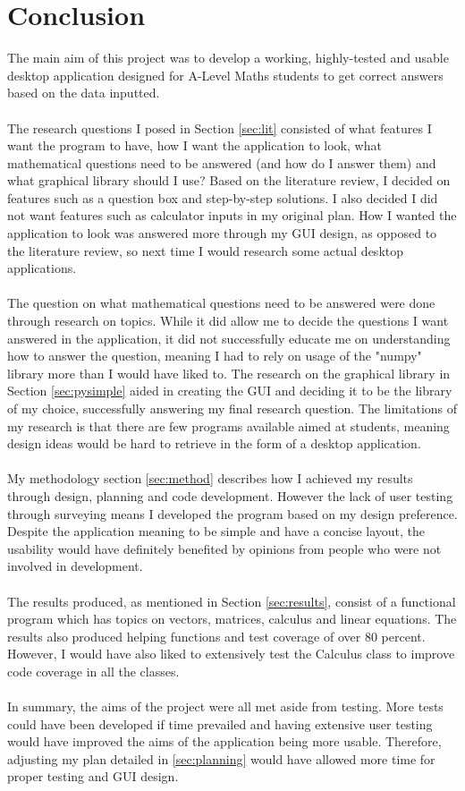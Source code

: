 \documentclass[final]{cmpreport}
\begin{document}
	\section{Conclusion}
	
	The main aim of this project was to develop a working, highly-tested and usable desktop application designed for A-Level Maths students to get correct answers based on the data inputted.\\
	\\The research questions I posed in Section \ref{sec:lit} consisted of what features I want the program to have, how I want the application to look, what mathematical questions need to be answered (and how do I answer them) and what graphical library should I use? Based on the literature review, I decided on features such as a question box and step-by-step solutions. I also decided I did not want features such as calculator inputs in my original plan. How I wanted the application to look was answered more through my GUI design, as opposed to the literature review, so next time I would research some actual desktop applications. \\
	\\The question on what mathematical questions need to be answered were done through research on topics. While it did allow me to decide the questions I want answered in the application, it did not successfully educate me on understanding how to answer the question, meaning I had to rely on usage of the "numpy" library more than I would have liked to. The research on the graphical library in Section \ref{sec:pysimple} aided in creating the GUI and deciding it to be the library of my choice, successfully answering my final research question. The limitations of my research is that there are few programs available aimed at students, meaning design ideas would be hard to retrieve in the form of a desktop application. \\
	\\My methodology section \ref{sec:method} describes how I achieved my results through design, planning and code development. However the lack of user testing through surveying means I developed the program based on my design preference. Despite the application meaning to be simple and have a concise layout, the usability would have definitely benefited by opinions from people who were not involved in development.\\
	\\The results produced, as mentioned in Section \ref{sec:results}, consist of a functional program which has topics on vectors, matrices, calculus and linear equations. The results also produced helping functions and test coverage of over 80 percent. However, I would have also liked to extensively test the Calculus class to improve code coverage in all the classes. \\
	\\In summary, the aims of the project were all met aside from testing. More tests could have been developed if time prevailed and having extensive user testing would have improved the aims of the application being more usable. Therefore, adjusting my plan detailed in \ref{sec:planning} would have allowed more time for proper testing and GUI design.

	\newpage
\newpage
	
	
\end{document}
